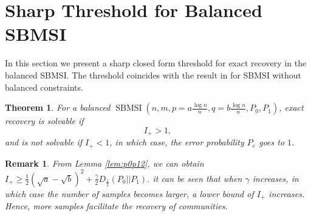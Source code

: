 \documentclass[conference]{IEEEtran}
\newtheorem{theorem}{Theorem}
\newtheorem{remark}{Remark}
\DeclareMathOperator{\SBMSI}{SBMSI}
\begin{document}
	\section{Sharp Threshold for Balanced SBMSI}\label{s:sharp}
	In this section we present a sharp closed form threshold for exact recovery in the balanced SBMSI. The threshold coincides with the result in \cite{abbe17sideinfo} for SBMSI without balanced constraints.  %
	\begin{theorem}\label{thm:Pe}
		For a balanced $\SBMSI(n,m,p=a\frac{\log n}{n},q=b\frac{\log n}{n},P_0,P_1)$, exact recovery is solvable if
		\begin{equation}\label{eq:positive_condition}
			I_+ > 1,
		\end{equation}
		and is not solvable if $I_+ < 1$, in which case, the error probability $P_e$ goes to $1$.
	\end{theorem}
	\begin{remark}
	From Lemma \ref{lem:p0p12}, 
	we can obtain $I_+ \geq \frac{1}{2}
	(\sqrt{a} - \sqrt{b})^2 +
	\frac{\gamma}{2} D_{\frac{1}{2}}(P_0||P_1)$.
	it can be seen that when $\gamma$ increases, in which case the number of samples becomes larger, a lower bound of $I_+$ increases. Hence, more samples facilitate the recovery of communities. 
	\end{remark}
\end{document}
